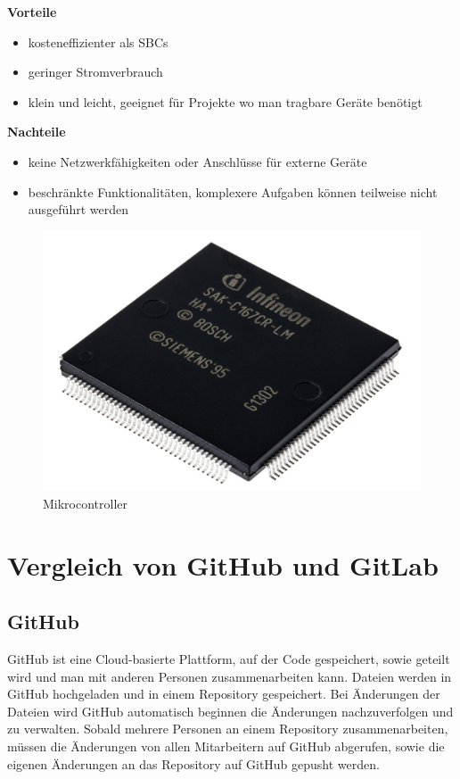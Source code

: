 \textbf{Vorteile}
\begin{itemize}
	\item kosteneffizienter als SBCs
	\item geringer Stromverbrauch
	\item klein und leicht, geeignet für Projekte wo man tragbare Geräte benötigt 
\end{itemize}

\textbf{Nachteile}
\begin{itemize}
	\item keine Netzwerkfähigkeiten oder Anschlüsse für externe Geräte
	\item beschränkte Funktionalitäten, komplexere Aufgaben können teilweise nicht ausgeführt werden
\end{itemize}

\begin{figure}[H]
	\centering
	\includegraphics[width=0.7\linewidth]{images/Mikrocontroller.jpg}
	\caption[Mikrocontroller]{Mikrocontroller}
	\label{fig:Mikrocontroller}
\end{figure}


\section{Vergleich von GitHub und GitLab}
\subsection{GitHub}
GitHub ist eine Cloud-basierte Plattform, auf der Code gespeichert, sowie geteilt wird und man mit anderen Personen zusammenarbeiten kann. Dateien werden in GitHub hochgeladen und in einem Repository gespeichert. Bei Änderungen der Dateien wird GitHub automatisch beginnen die Änderungen nachzuverfolgen und zu verwalten. Sobald mehrere Personen an einem Repository zusammenarbeiten, müssen die Änderungen von allen Mitarbeitern auf GitHub abgerufen, sowie die eigenen Änderungen an das Repository auf GitHub gepusht werden. \parencite{GitHubUndGit}

